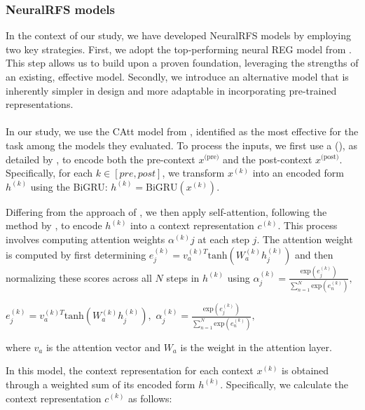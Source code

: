 \subsubsection{NeuralRFS models}

In the context of our study, we have developed NeuralRFS models by employing two key strategies. First, we adopt the top-performing neural REG model from \citet{ferreira2018neuralreg}. This step allows us to build upon a proven foundation, leveraging the strengths of an existing, effective model. Secondly, we introduce an alternative model that is inherently simpler in design and more adaptable in incorporating pre-trained representations. 

\paragraph*{} 

In our study, we use the CAtt model from \citet{ferreira2018neuralreg}, identified as the most effective for the \context task among the models they evaluated. To process the inputs, we first use a   (), as detailed by \citet{cho-etal-2014-learning}, to encode both the pre-context $x^{\text{(pre)}}$ and the post-context $x^{\text{(post)}}$. Specifically, for each $k\in[pre, post]$, we transform $x^{(k)}$ into an encoded form $h^{(k)}$ using the BiGRU: $h^{(k)} = \mbox{BiGRU}(x^{(k)})$. 

Differing from the approach of \citet{ferreira2018neuralreg}, we then apply self-attention, following the method by \citet{yang-etal-2016-hierarchical}, to encode $h^{(k)}$ into a context representation $c^{(k)}$. This process involves computing attention weights $\alpha^{(k)}j$ at each step $j$. The attention weight is computed by first determining 
\ea$
e_j^{(k)} = v_a^{(k)T}\mbox{tanh}(W_a^{(k)}h_j^{(k)})
$\z
and then normalizing these scores across all $N$ steps in $h^{(k)}$ using
\ea$
\alpha_j^{(k)} = \frac{\text{exp}(e_j^{(k)})}{\sum_{n=1}^N \text{exp}(e_n^{(k)})},
$\z

\ea$
	e_j^{(k)} = v_a^{(k)T}\mbox{tanh}(W_a^{(k)}h_j^{(k)}),
$\z
\ea$
	\alpha_j^{(k)} = \frac{\text{exp}(e_j^{(k)})}{\sum_{n=1}^N \text{exp}(e_n^{(k)})},
$\z


where $v_a$ is the attention vector and $W_a$ is the weight in the attention layer. 

In this model, the context representation for each context $x^{(k)}$ is obtained through a weighted sum of its encoded form $h^{(k)}$. Specifically, we calculate the context representation $c^{(k)}$ as follows:

